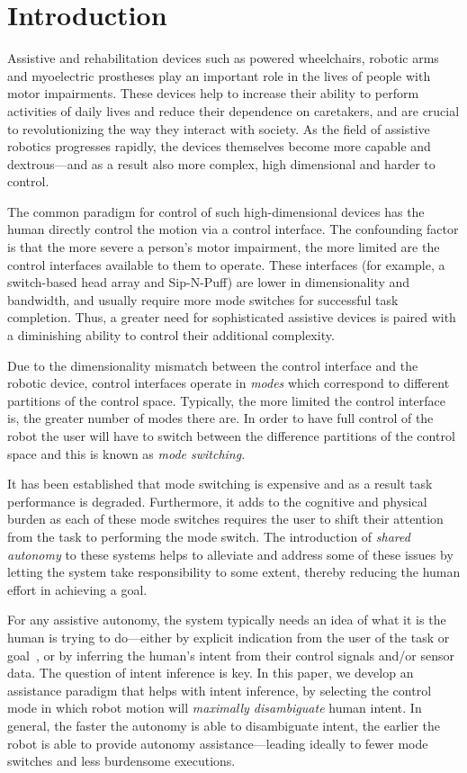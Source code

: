 \documentclass[conference]{IEEEtran}
\begin{document}
\IEEEpeerreviewmaketitle

\section{Introduction}

Assistive and rehabilitation devices such as powered wheelchairs, robotic arms and myoelectric prostheses play an important role in the lives of people with motor impairments. These devices help to increase their ability to perform activities of daily lives and reduce their dependence on caretakers, and are crucial to revolutionizing the way they interact with society. As the field of assistive robotics progresses rapidly, the devices themselves become more capable and dextrous---and as a result also more complex, high dimensional and harder to control. 

The common paradigm for control of such high-dimensional devices has the human directly control the motion via a control interface. The confounding factor is that the more severe a person's motor impairment, the more limited are the control interfaces available to them to operate. These interfaces (for example,  a switch-based head array and Sip-N-Puff) are lower in dimensionality and bandwidth, and usually require more mode switches for successful task completion. Thus, a greater need for sophisticated assistive devices is paired with a diminishing ability to control their additional complexity. 

Due to the dimensionality mismatch between the control interface and the robotic device, control interfaces operate in \textit{modes} which correspond to different partitions of the control space. Typically, the more limited the control interface is, the greater number of modes there are. In order to have full control of the robot the user will have to switch between the difference partitions of the control space and this is known as \textit{mode switching}. 

It has been established that mode switching is expensive and as a result task performance is degraded. Furthermore, it adds to the cognitive and physical burden as each of these mode switches requires the user to shift their attention from the task to performing the mode switch. The introduction of \textit{shared autonomy} to these systems helps to alleviate and address some of these issues by letting the system take responsibility to some extent, thereby reducing the human effort in achieving a goal. 

For any assistive autonomy, the system typically needs an idea of what it is the human is trying to do---either by explicit indication from the user of the task or goal~\cite{choi2008laser}, or by inferring the human's intent from their control signals and/or sensor data. The question of intent inference is key. In this paper, we develop an assistance paradigm that helps with intent inference, by selecting the control mode in which robot motion will \textit{maximally disambiguate} human intent. In general, the faster the autonomy is able to disambiguate intent, the earlier the robot is able to provide autonomy assistance---leading ideally to fewer mode switches and less burdensome executions. 
\end{document}
